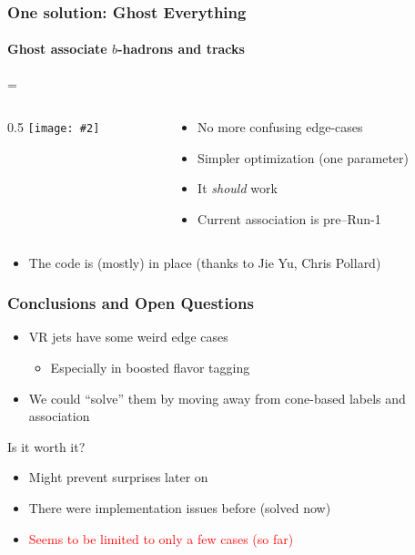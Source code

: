 \documentclass[xcolor={table}]{beamer}
\newcommand{\graphic}[2][0.99]{\texttt{[image: \#2]}}
\newcommand{\twocol}[3][0.5]{
  \newdimen\scwid
  \scwid=\dimexpr\textwidth-#1\textwidth\relax
  \begin{columns}
    \begin{column}{#1\textwidth}#2\end{column}
      \begin{column}{\scwid}#3\end{column}
  \end{columns}
}
\begin{document}
\begin{frame}
  \frametitle{One solution: Ghost Everything}
  \framesubtitle{Ghost associate $b$-hadrons and tracks}
  \twocol{
    \graphic{vr.pdf}
  }{
    \begin{itemize}
    \item No more confusing edge-cases
    \item Simpler optimization (one parameter)
    \item It \emph{should} work
    \item Current association is pre--Run-1
    \end{itemize}
  }
  \begin{itemize}
  \item The code is (mostly) in place (thanks to Jie Yu, Chris Pollard)
  \end{itemize}
\end{frame}

\begin{frame}
  \frametitle{Conclusions and Open Questions}
  \begin{itemize}
  \item VR jets have some weird edge cases
    \begin{itemize}
    \item Especially in boosted flavor tagging
    \end{itemize}
  \item We could ``solve'' them by moving away from cone-based labels and association
  \end{itemize}
  \begin{block}{Is it worth it?}
    \begin{itemize}
    \item \textcolor{dg}{Might prevent surprises later on}
    \item There were implementation issues before (solved now)
    \item \textcolor{red}{Seems to be limited to only a few cases (so far)}
    \end{itemize}
  \end{block}
\end{frame}

\end{document}
